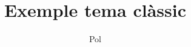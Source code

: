 \documentclass{beamer}
\title{Exemple tema clàssic}
\author{Pol}
\begin{document}
\begin{frame}
\titlepage
\end{frame}
\end{document}
